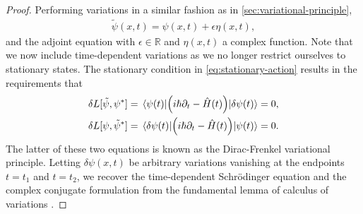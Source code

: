         \begin{proof}
            Performing variations in a similar fashion as in
            \autoref{sec:variational-principle},
            \begin{gather}
                \tilde{\psi}(x, t) = \psi(x, t) + \epsilon\eta(x, t),
            \end{gather}
            and the adjoint equation with $\epsilon \in \mathbb{R}$ and $\eta(x,
            t)$ a complex function.
            Note that we now include time-dependent variations as we no longer
            restrict ourselves to stationary states.
            The stationary condition in \autoref{eq:stationary-action} results
            in the requirements that
            \begin{gather}
                \delta L[\tilde{\psi}, \psi^{*}]
                = \mel*{\psi(t)}{
                    \left( 
                        i\hslash\partial_t - \hat{H}(t)
                     \right)
                }{\delta\psi(t)}
                = 0, \\
                \delta L[\psi, \tilde{\psi}^{*}]
                = \mel*{\delta\psi(t)}{
                    \left( 
                        i\hslash\partial_t - \hat{H}(t)
                     \right)
                }{\psi(t)}
                = 0.
            \end{gather}
            The latter of these two equations is known as the Dirac-Frenkel
            variational principle.
            Letting $\delta\psi(x, t)$ be arbitrary variations vanishing at the
            endpoints $t = t_1$ and $t = t_2$, we recover the
            time-dependent Schrödinger equation and the complex conjugate
            formulation from the fundamental lemma of calculus of variations \cite{frenkel,
            jost1998calculus}.
        \end{proof}

